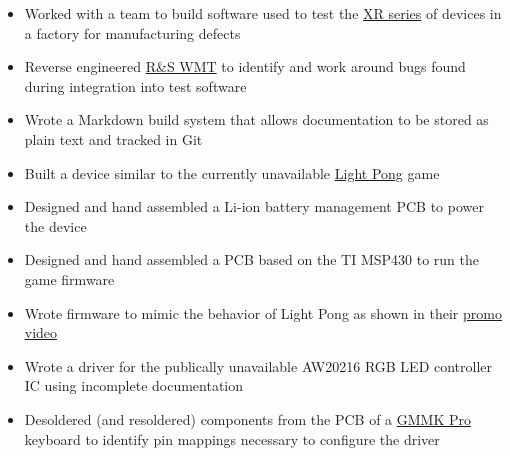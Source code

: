 \documentclass{resume}
\begin{document}
\begin{itemize}
    \item Worked with a team to build software used to test the \href{https://source.sierrawireless.com/devices/xr-series/xr90/}{XR series} of devices in a factory for manufacturing defects
    \item Reverse engineered \href{https://www.rohde-schwarz.com/us/products/test-and-measurement/wireless-communications-testers-systems/wireless-communication-testers-systems/wireless-manufacturing-test_253261.html}{R\&S WMT} to identify and work around bugs found during integration into test software
    \item Wrote a Markdown build system that allows documentation to be stored as plain text and tracked in Git
\end{itemize}

\TechnicalProjects

\begin{itemize}
    \item Built a device similar to the currently unavailable \href{https://www.playlightpong.com/}{Light Pong} game
    \item Designed and hand assembled a Li-ion battery management PCB to power the device
    \item Designed and hand assembled a PCB based on the TI MSP430 to run the game firmware
    \item Wrote firmware to mimic the behavior of Light Pong as shown in their \href{https://player.vimeo.com/video/616594964}{promo video}
\end{itemize}

\begin{itemize}
    \item Wrote a driver for the publically unavailable AW20216 RGB LED controller IC using incomplete documentation
    \item Desoldered (and resoldered) components from the PCB of a \href{https://www.gloriousgaming.com/products/glorious-gmmk-pro-75-barebone-black}{GMMK Pro} keyboard to identify pin mappings necessary to configure the driver
\end{itemize}
\end{document}
